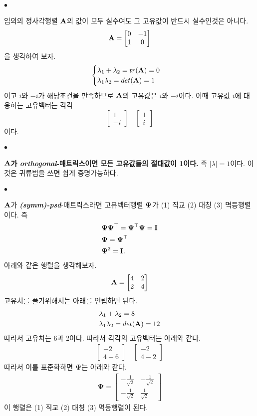 \documentclass[12pt,oneside,english,a4paper]{article}
\def\ck{\paragraph{\Large$\bullet$}\Large}
\newcommand{\bs}[1]{\mbox{\boldmath $#1$}}
\newcommand{\bfA}{\mbox{$\bf{A}$}}
\newcommand{\bfI}{\mbox{$\bf{I}$}}
\begin{document}
\ck 임의의 정사각행렬 ${\bf A}$의 값이 모두 실수여도 그 고유값이 반드시 실수인것은 아니다. 
\[
{\bf A}=\begin{bmatrix} 0 & -1 \\ 1 & 0 \end{bmatrix}
\]
을 생각하여 보자. 
$$
\begin{cases}
\lambda_1+\lambda_2=tr(\bfA)=0 \\
\lambda_1 \lambda_2=det(\bfA)=1
\end{cases}
$$
이고 $i$와 $-i$가 해당조건을 만족하므로 ${\bf A}$의 고유값은 $i$와 $-i$이다. 이때 고유값 $i$에 대응하는 고유벡터는 각각 
\[
\begin{bmatrix} 1 \\ -i \end{bmatrix} \quad \begin{bmatrix} 1 \\ i \end{bmatrix}
\]
이다. 

\ck \textbf{${\bf A}$가 \emph{orthogonal}-매트릭스이면 모든 고유값들의 절대값이 1이다.} 즉 $|\lambda|=1$이다. 이것은 귀류법을 쓰면 쉽게 증명가능하다.

\ck $\bfA$가 \textbf{\emph{(symm)-psd}}-매트릭스라면 고유벡터행렬 $\bs{\Psi}$가 (1) 직교 (2) 대칭 (3) 멱등행렬이다. 즉
\begin{align*}
& \bs{\Psi}\bs{\Psi}^\top=\bs{\Psi}^\top\bs{\Psi}=\bfI \\
& \bs{\Psi}=\bs{\Psi}^\top \\
& \bs{\Psi}^2=\bfI.
\end{align*}
아래와 같은 행렬을 생각해보자. 
\begin{align*}
{\bf A}=\begin{bmatrix} 4 & 2 \\ 2 & 4 \end{bmatrix}
\end{align*}
고유치를 풀기위해서는 아래를 연립하면 된다. 
\begin{align*}
& \lambda_1 +\lambda_2 = 8 \\ 
& \lambda_1 \lambda_2 = det({\bf A})=12 
\end{align*}
따라서 고유치는 6과 2이다. 따라서 각각의 고유벡터는 아래와 같다. 
\begin{align*}
\begin{bmatrix} -2 \\ 4-6 \end{bmatrix} \quad \begin{bmatrix} -2 \\ 4-2 \end{bmatrix}
\end{align*}
따라서 이를 표준화하면 $\boldsymbol\Psi$는 아래와 같다. 
\begin{align*}
{\boldsymbol \Psi} = \begin{bmatrix} -\frac{1}{\sqrt{2}} & -\frac{1}{\sqrt{2}} \\ -\frac{1}{\sqrt{2}} & \frac{1}{\sqrt{2}} \end{bmatrix} 
\end{align*}
이 행렬은 (1) 직교 (2) 대칭 (3) 멱등행렬이 된다. 
\end{document}
